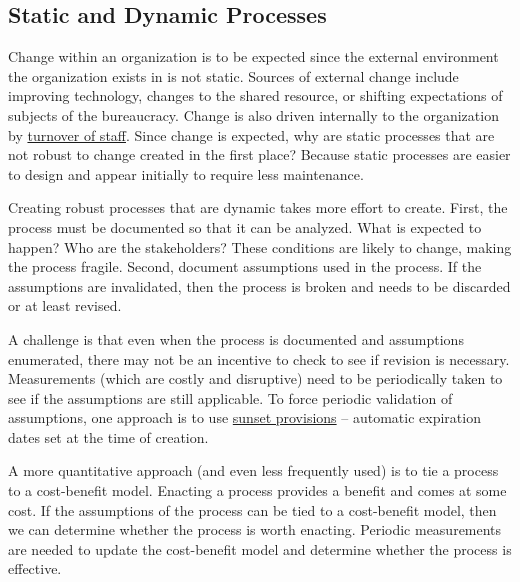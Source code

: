 \subsection*{Static and Dynamic Processes\label{sec:static-dynamic-processes}}


Change within an \gls{organization} \iftoggle{glossaryinmargin}{\marginpar{[Glossary]}}{}%
is to be expected since the external environment the organization exists in is not static. 
Sources of external change include improving technology, changes to the \gls{shared resource}, \iftoggle{glossaryinmargin}{\marginpar{[Glossary]}}{}%
or shifting expectations of subjects of the bureaucracy.
Change is also driven internally to the organization by \hyperref[sec:turnover]{turnover of staff}.%
Since change is expected, why are static processes that are not robust to change created in the first place? Because static processes are easier to design and appear initially to require less maintenance.

Creating robust processes that are dynamic takes more effort to create. First, the process must be documented so that it can be analyzed. What is expected to happen? Who are the stakeholders? These conditions are likely to change, making the process fragile. Second, document assumptions used in the process. If the assumptions are invalidated, then the process is broken and needs to be discarded or at least revised. 

A challenge is that even when the process is documented and assumptions enumerated, there may not be an incentive to check to see if revision is necessary. Measurements (which are costly and disruptive) need to be periodically taken to see if the assumptions are still applicable. To force periodic validation of assumptions, one approach is to use \href{https://en.wikipedia.org/wiki/Sunset_provision}{sunset provisions} -- automatic expiration dates set at the time of creation. 
\iftoggle{WPinmargin}{\marginpar{$>$Wikipedia: sunset provisions}}{ }%

A more quantitative approach (and even less frequently used) is to tie a process to a cost-benefit model. Enacting a process provides a benefit and comes at some cost. If the assumptions of the process can be tied to a cost-benefit model, then we can determine whether the process is worth enacting. Periodic measurements are needed to update the cost-benefit model and determine whether the process is effective.

